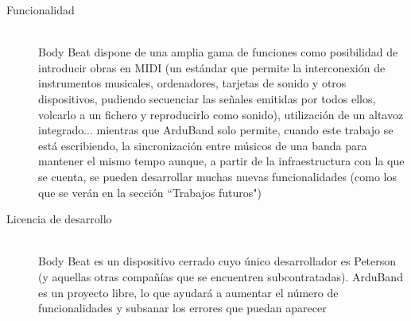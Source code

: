 \begin{description}
  \item[Funcionalidad] \hfill \\
    Body Beat dispone de una amplia gama de funciones como posibilidad de introducir
    obras en MIDI (un estándar que permite la interconexión de instrumentos musicales,
    ordenadores, tarjetas de sonido y otros dispositivos, pudiendo secuenciar las señales
    emitidas por todos ellos, volcarlo a un fichero y reproducirlo como sonido), utilización
    de un altavoz integrado... mientras que ArduBand solo permite, cuando este trabajo
    se está escribiendo, la sincronización entre músicos de una banda para mantener
    el mismo tempo aunque, a partir de la infraestructura con la que se cuenta, se pueden
    desarrollar muchas nuevas funcionalidades (como los que se verán en la sección ``Trabajos futuros")

  \item[Licencia de desarrollo] \hfill \\
    Body Beat es un dispositivo cerrado cuyo único desarrollador es Peterson (y aquellas otras
    compañías que se encuentren subcontratadas). ArduBand es un proyecto libre, lo que
    ayudará a aumentar el número de funcionalidades y subsanar los errores que puedan aparecer


\end{description}
